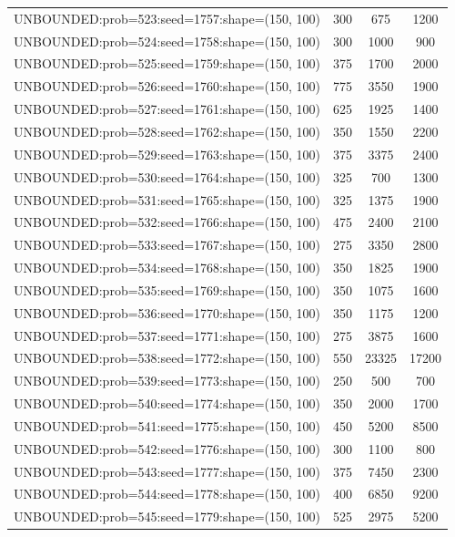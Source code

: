 \begin{longtable}{lccc}
UNBOUNDED:prob=523:seed=1757:shape=(150, 100) &      300 &   675 &   1200 \\
UNBOUNDED:prob=524:seed=1758:shape=(150, 100) &      300 &  1000 &    900 \\
UNBOUNDED:prob=525:seed=1759:shape=(150, 100) &      375 &  1700 &   2000 \\
UNBOUNDED:prob=526:seed=1760:shape=(150, 100) &      775 &  3550 &   1900 \\
UNBOUNDED:prob=527:seed=1761:shape=(150, 100) &      625 &  1925 &   1400 \\
UNBOUNDED:prob=528:seed=1762:shape=(150, 100) &      350 &  1550 &   2200 \\
UNBOUNDED:prob=529:seed=1763:shape=(150, 100) &      375 &  3375 &   2400 \\
UNBOUNDED:prob=530:seed=1764:shape=(150, 100) &      325 &   700 &   1300 \\
UNBOUNDED:prob=531:seed=1765:shape=(150, 100) &      325 &  1375 &   1900 \\
UNBOUNDED:prob=532:seed=1766:shape=(150, 100) &      475 &  2400 &   2100 \\
UNBOUNDED:prob=533:seed=1767:shape=(150, 100) &      275 &  3350 &   2800 \\
UNBOUNDED:prob=534:seed=1768:shape=(150, 100) &      350 &  1825 &   1900 \\
UNBOUNDED:prob=535:seed=1769:shape=(150, 100) &      350 &  1075 &   1600 \\
UNBOUNDED:prob=536:seed=1770:shape=(150, 100) &      350 &  1175 &   1200 \\
UNBOUNDED:prob=537:seed=1771:shape=(150, 100) &      275 &  3875 &   1600 \\
UNBOUNDED:prob=538:seed=1772:shape=(150, 100) &      550 & 23325 &  17200 \\
UNBOUNDED:prob=539:seed=1773:shape=(150, 100) &      250 &   500 &    700 \\
UNBOUNDED:prob=540:seed=1774:shape=(150, 100) &      350 &  2000 &   1700 \\
UNBOUNDED:prob=541:seed=1775:shape=(150, 100) &      450 &  5200 &   8500 \\
UNBOUNDED:prob=542:seed=1776:shape=(150, 100) &      300 &  1100 &    800 \\
UNBOUNDED:prob=543:seed=1777:shape=(150, 100) &      375 &  7450 &   2300 \\
UNBOUNDED:prob=544:seed=1778:shape=(150, 100) &      400 &  6850 &   9200 \\
UNBOUNDED:prob=545:seed=1779:shape=(150, 100) &      525 &  2975 &   5200 \\

\end{longtable}
